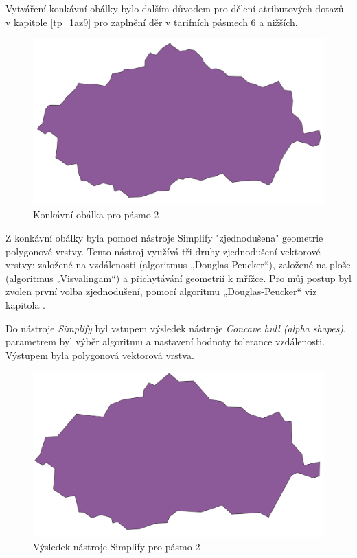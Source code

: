 Vytváření konkávní obálky bylo dalším důvodem pro dělení atributových dotazů v kapitole \ref{tp_1az9} pro 
zaplnění děr v tarifních pásmech 6 a nižších.  

\begin{figure}[H] \centering
    \includegraphics[width=400pt]{./pictures/concaveHull.png}
    \caption[Konkávní obálka pro pásmo 2]{Konkávní obálka pro pásmo 2}
	\label{fig:concaveHull}              
\end{figure} 

Z konkávní obálky byla pomocí nástroje Simplify "zjednodušena" geometrie polygonové vrstvy. Tento nástroj
využívá tři druhy zjednodušení vektorové vrstvy: založené na vzdálenosti (algoritmus „Douglas-Peucker“),
založené na ploše (algoritmus „Visvalingam“) a přichytávání geometrií k mřížce.
Pro můj postup byl zvolen první volba zjednodušení, pomocí algoritmu „Douglas-Peucker“ viz kapitola \label{generalizace_zjemneni}.

Do nástroje \textit{Simplify} byl vstupem výsledek nástroje \textit{Concave hull (alpha shapes)}, parametrem byl výběr algoritmu 
a nastavení hodnoty tolerance vzdálenosti. Výstupem byla polygonová vektorová vrstva.

\begin{figure}[H] \centering
    \includegraphics[width=400pt]{./pictures/simplify.png}
    \caption[Výsledek nástroje Simplify pro pásmo 2]{Výsledek nástroje Simplify pro pásmo 2}
	\label{fig:simplify}                                
\end{figure}

